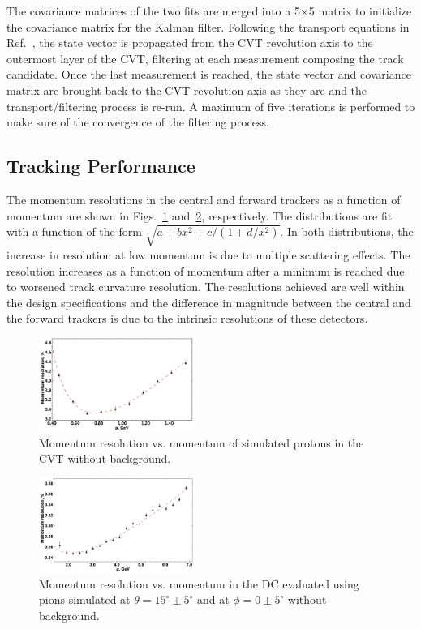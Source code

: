 The covariance matrices of the two fits are merged into a 5$\times$5 matrix to initialize the covariance matrix
for the Kalman filter. Following the transport equations in Ref.~\cite{ILC-Tracking}, the state vector is
propagated from the CVT revolution axis to the outermost layer of the CVT, filtering at each measurement
composing the track candidate. Once the last measurement is reached, the state vector and covariance matrix
are brought back to the CVT revolution axis as they are and the transport/filtering process is re-run. A maximum
of five iterations is performed to make sure of the convergence of the filtering process.

\subsection{Tracking Performance}

The momentum resolutions in the central and forward trackers as a function of momentum are shown in
Figs.~\ref{fig:respcvt} and~\ref{fig:respdc}, respectively. The distributions are fit with a function of the form
$\sqrt{a+b x^2+c/(1+d/x^2)}$.  In both distributions, the increase in resolution at low momentum is due to multiple
scattering effects. The resolution increases as a function of momentum after a minimum is reached due to
worsened track curvature resolution. The resolutions achieved are well within the design specifications and the
difference in magnitude between the central and the forward trackers is due to the intrinsic resolutions of these
detectors. 

\begin{figure}
\includegraphics[width=0.45\textwidth]{pics/fddegipekmpjjiho.png}
\caption{Momentum resolution vs. momentum of simulated protons in the CVT without background.}
\label{fig:respcvt}
\end{figure}

\begin{figure}
\includegraphics[width=0.45\textwidth]{pics/DCRes.png}
\caption{Momentum resolution vs. momentum in the DC evaluated using pions simulated at
  $\theta =15^\circ \pm 5^\circ$ and at $\phi = 0 \pm 5^\circ$ without background.}
\label{fig:respdc}
\end{figure}


